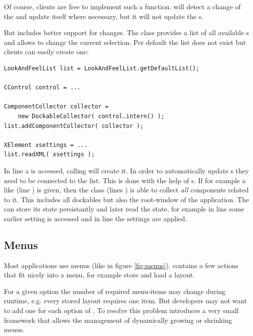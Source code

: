 Of course, clients are free to implement such a function.  will detect a change of the  and update itself where necessary, but it will not update the s.

But  includes better support for  changes. The class  provides a list of all available s and allows to change the current selection. Per default the list does not exist but clients can easily create one:

\begin{lstlisting}
LookAndFeelList list = LookAndFeelList.getDefaultList();

CControl control = ...

ComponentCollector collector = 
	new DockableCollector( control.intern() );
list.addComponentCollector( collector );

XElement xsettings = ...
list.readXML( xsettings );
\end{lstlisting}
In line  a  is accessed, calling  will create it. In order to automatically update s they need to be connected to the list. This is done with the help of s. If for example a  like  (line ) is given, then the class  (lines ) is able to collect \textit{all} components related to it. This includes all dockables but also the root-window of the application. The  can store its state persistantly and later read the state, for example in line  some earlier setting is accessed and in line  the settings are applied.


\subsection{Menus} \label{sec:menus}
Most  applications use menus (like in figure \ref{fig:menus}).  contains a few actions that fit nicely into a menu, for example store and load a layout.

For a given option the number of required menu-items may change during runtime, e.g. every stored layout requires one item. But developers may not want to add one  for each option of . To resolve this problem  introduces a very small framework that allows the management of dynamically growing or shrinking menus.

